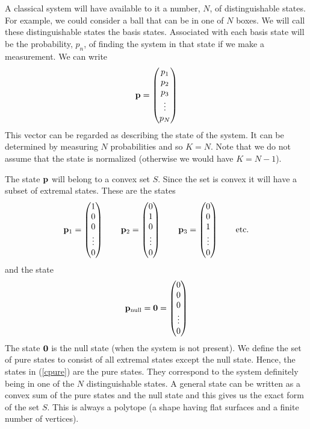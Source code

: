 \documentclass[10pt,twocolumn]{article}
\begin{document}
A classical system will have available to it a number, $N$, of distinguishable
states.  For example, we could consider a ball that can be in one of $N$
boxes.  We will call these distinguishable states the basis states.
Associated with each basis state will be the probability, $p_n$, of finding the
system in that state if we make a measurement. We can write
\begin{equation}
  {\bf p} = \left(
  \begin{matrix} p_1 \\ p_2 \\ p_3 \\ \vdots \\ p_N \end{matrix} \right)
\end{equation}
This vector can be regarded as describing the state of the system. It
can be determined by measuring $N$ probabilities and so $K=N$.
Note that we do not assume that the state is normalized (otherwise we
would have $K=N-1$).

The state ${\bf p}$ will belong to a convex set $S$.  Since the set is
convex it will have a subset of extremal states. These are the states
\begin{equation}\label{cpure}
{\bf p}_1= \left(
\begin{matrix} 1 \\ 0 \\ 0 \\ \vdots \\ 0 \end{matrix} \right) \qquad
{\bf p}_2= \left(
\begin{matrix} 0 \\ 1 \\ 0 \\ \vdots \\ 0 \end{matrix} \right) \qquad
{\bf p}_3= \left(
\begin{matrix} 0 \\ 0 \\ 1 \\ \vdots \\ 0 \end{matrix} \right) \qquad
{\rm etc.}
\end{equation}
and the state
\begin{equation}
{\bf p}_{\rm null}= {\bf 0} =
\left( \begin{matrix} 0 \\ 0 \\ 0 \\ \vdots \\ 0 \end{matrix} \right)
\end{equation}
The state ${\bf 0}$ is the null state (when the system is not present).
We define the set of pure states to consist of all extremal states
except the null state.  Hence, the states in (\ref{cpure}) are the pure
states.  They correspond to the system definitely being in one of the
$N$ distinguishable states.  A general state can be written as a convex
sum of the pure states and the null state and this gives us the exact
form of the set $S$.  This is always a polytope (a shape having flat
surfaces and a finite number of vertices).
\end{document}
